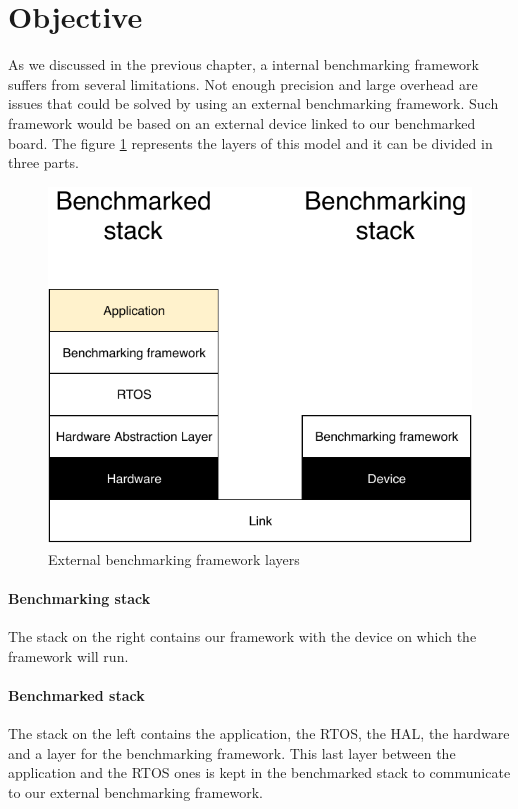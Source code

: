 \section{Objective}

As we discussed in the previous chapter, a internal benchmarking framework suffers from several limitations.
Not enough precision and large overhead are issues that could be solved by using an external benchmarking framework.
Such framework would be based on an external device linked to our benchmarked board.
The figure \ref{fig:external-bench-layers} represents the layers of this model and it can be divided in three parts.

\begin{figure}[!ht]
  \centering
  \includegraphics[scale=1]{assets/external-bench-layers.pdf}
  \caption{\label{fig:external-bench-layers}External benchmarking framework layers}
\end{figure}

\paragraph{Benchmarking stack}
The stack on the right contains our framework with the device on which the framework will run.

\paragraph{Benchmarked stack}
The stack on the left contains the application, the RTOS, the HAL, the hardware and a layer for the benchmarking framework.
This last layer between the application and the RTOS ones is kept in the benchmarked stack to communicate to our external benchmarking framework.

